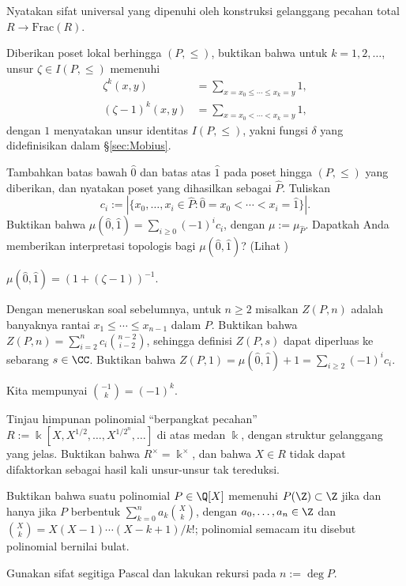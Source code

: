 \begin{Exercises}
	\item Nyatakan sifat universal yang dipenuhi oleh konstruksi gelanggang pecahan total $R \to \text{Frac}(R)$.
	\item Diberikan poset lokal berhingga $(P, \leq)$, buktikan bahwa untuk $k=1,2,\ldots$, unsur $\zeta \in I(P, \leq)$ memenuhi
		\begin{align*}
			\zeta^k(x,y) & = \sum_{x = x_0 \leq \cdots \leq x_k = y} 1, \\
			(\zeta - 1)^k(x,y) & = \sum_{x = x_0 < \cdots < x_k = y} 1,
		\end{align*}
		dengan $1$ menyatakan unsur identitas $I(P,\leq)$, yakni fungsi $\delta$ yang didefinisikan dalam \S\ref{sec:Mobius}.
	\item Tambahkan batas bawah $\hat{0}$ dan batas atas $\hat{1}$ pada poset hingga $(P,\leq)$ yang diberikan, dan nyatakan poset yang dihasilkan sebagai $\hat{P}$. Tuliskan
		\[ c_i := \left| \{ x_0, \ldots, x_i \in \hat{P} : \hat{0} = x_0 < \cdots < x_i = \hat{1} \} \right|. \]
		Buktikan bahwa $\mu(\hat{0}, \hat{1}) = \sum_{i \geq 0} (-1)^i c_i$, dengan $\mu := \mu_{\hat{P}}$. Dapatkah Anda memberikan interpretasi topologis bagi $\mu(\hat{0}, \hat{1})$? (Lihat \cite[\S 3.8]{Stan09})
		\begin{hint}
			$\mu(\hat{0}, \hat{1}) = (1 + (\zeta - 1))^{-1}$.
		\end{hint}
	\item Dengan meneruskan soal sebelumnya, untuk $n \geq 2$ misalkan $Z(P,n)$ adalah banyaknya rantai $x_1 \leq \cdots \leq x_{n-1}$ dalam $P$. Buktikan bahwa $Z(P,n) = \sum_{i=2}^n c_i \binom{n-2}{i-2}$, sehingga definisi $Z(P,s)$ dapat diperluas ke sebarang $s \in \CC$. Buktikan bahwa $Z(P,1) = \mu(\hat{0},\hat{1}) + 1 = \sum_{i \geq 2} (-1)^i c_i$. \begin{hint} Kita mempunyai $\binom{-1}{k} = (-1)^k$. \end{hint}
	\item Tinjau himpunan polinomial ``berpangkat pecahan'' $R := \Bbbk[X, X^{1/2}, \ldots, X^{1/2^n}, \ldots]$ di atas medan $\Bbbk$, dengan struktur gelanggang yang jelas. Buktikan bahwa $R^\times = \Bbbk^\times$, dan bahwa $X \in R$ tidak dapat difaktorkan sebagai hasil kali unsur-unsur tak tereduksi.
	\item Buktikan bahwa suatu polinomial $P \in \Q[X]$ memenuhi $P(\Z) \subset \Z$ jika dan hanya jika $P$ berbentuk $\sum_{k=0}^n a_k \binom{X}{k}$, dengan $a_0, \ldots, a_n \in \Z$ dan $\binom{X}{k} = X(X-1) \cdots (X-k+1)/k!$; polinomial semacam itu disebut polinomial bernilai bulat. \begin{hint} Gunakan sifat segitiga Pascal dan lakukan rekursi pada $n := \deg P$. \end{hint}

\end{Exercises}
